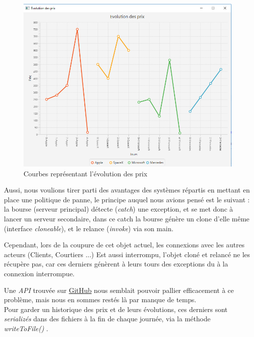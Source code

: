\documentclass[11pt]{article}
\begin{document}
\begin{figure}[!htb]
  \centering
    \caption{Courbes représentant l'évolution des prix}
    \includegraphics[width=\textwidth]{courbes.png}
\newline \newline
\end{figure}

Aussi, nous voulions tirer parti des avantages des systèmes répartis en mettant en place une politique de panne, le principe auquel nous avions pensé est le suivant : la bourse (serveur principal) détecte (\textit{catch}) une exception, et se met donc à lancer un serveur secondaire, dans ce catch la bourse génère un clone d'elle même (interface \textit{cloneable}), et le relance (\textit{invoke}) via son main. \newline

Cependant, lors de la coupure de cet objet actuel, les connexions avec les autres acteurs (Clients, Courtiers ...) Est aussi interrompu, l'objet cloné et relancé ne les récupère pas, car ces derniers génèrent à leurs tours des exceptions du à la connexion interrompue. \newline

Une \textit{API }trouvée sur \href{https://github.com/jhalterman/failsafe}{GitHub} nous semblait pouvoir pallier efficacement à ce problème, mais nous en sommes restés là par manque de temps.\\
Pour garder un historique des prix et de leurs évolutions, ces derniers sont \textit{serializés} dans des fichiers à la fin de chaque journée, via la méthode \textit{writeToFile()} .
\end{document}
